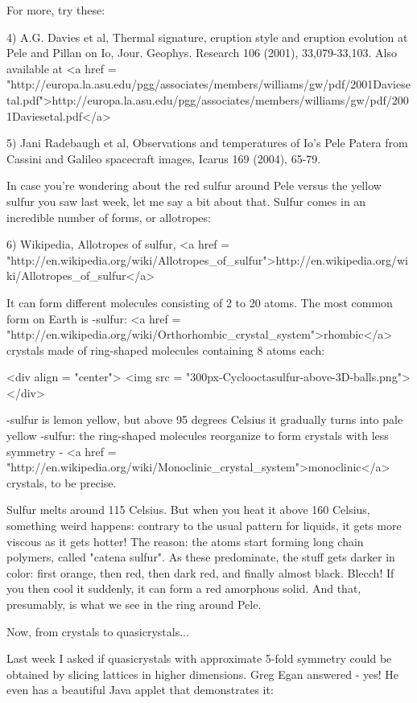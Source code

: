 For more, try these:

4) A.G. Davies et al, Thermal signature, eruption style and eruption
evolution at Pele and Pillan on Io, Jour. Geophys. Research 106
(2001), 33,079-33,103.  Also available at
<a href = "http://europa.la.asu.edu/pgg/associates/members/williams/gw/pdf/2001Daviesetal.pdf">http://europa.la.asu.edu/pgg/associates/members/williams/gw/pdf/2001Daviesetal.pdf</a>

5) Jani Radebaugh et al, Observations and temperatures of Io's 
Pele Patera from Cassini and Galileo spacecraft images, 
Icarus 169 (2004), 65-79.

In case you're wondering about the red sulfur around Pele versus the
yellow sulfur you saw last week, let me say a bit about that.  Sulfur
comes in an incredible number of forms, or allotropes:

6) Wikipedia, Allotropes of sulfur, <a href =
"http://en.wikipedia.org/wiki/Allotropes_of_sulfur">http://en.wikipedia.org/wiki/Allotropes_of_sulfur</a>

It can form different molecules consisting of 2 to 20 atoms.  The most
common form on Earth is \alpha -sulfur: <a href =
"http://en.wikipedia.org/wiki/Orthorhombic_crystal_system">rhombic</a>
crystals made of ring-shaped molecules containing 8 atoms each:

<div align = "center">
<img src = "300px-Cyclooctasulfur-above-3D-balls.png">
</div>

\alpha -sulfur is lemon yellow, but above 95 degrees Celsius it
gradually turns into pale yellow \beta -sulfur: the ring-shaped
molecules reorganize to form crystals with less symmetry - <a href =
"http://en.wikipedia.org/wiki/Monoclinic_crystal_system">monoclinic</a>
crystals, to be precise.

Sulfur melts around 115 Celsius.  But when you heat it above 160
Celsius, something weird happens: contrary to the usual pattern for
liquids, it gets more viscous as it gets hotter!  The reason: the
atoms start forming long chain polymers, called "catena
sulfur".  As these predominate, the stuff gets darker in color:
first orange, then red, then dark red, and finally almost black.
Blecch!  If you then cool it suddenly, it can form a red amorphous
solid.  And that, presumably, is what we see in the ring around Pele.

Now, from crystals to quasicrystals...

Last week I asked if quasicrystals with approximate 5-fold symmetry 
could be obtained by slicing lattices in higher dimensions.  Greg 
Egan answered - yes!  He even has a beautiful Java applet that 
demonstrates it:

